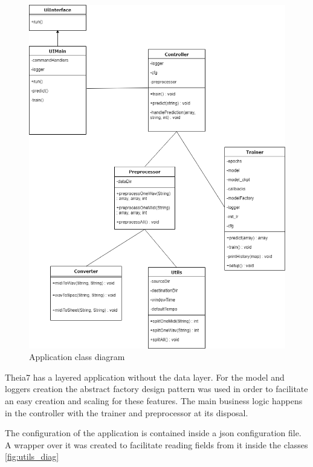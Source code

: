 \begin{figure}[H]
	\caption[Class diagram]{ Application class diagram }
	\centering
	\label{fig:class_diag}
	\includegraphics[width=1\textwidth, height=0.9\textheight, keepaspectratio]{"resources/class_diagram"}
\end{figure}

Theia7 has a layered application without the data layer. For the model and loggers creation the abstract factory design pattern was used in order to facilitate an easy creation and scaling for these features. The main business logic happens in the controller with the trainer and preprocessor at its disposal.
\par

The configuration of the application is contained inside a json configuration file. A wrapper over it was created to facilitate reading fields from it inside the classes \ref{fig:utils_diag}

